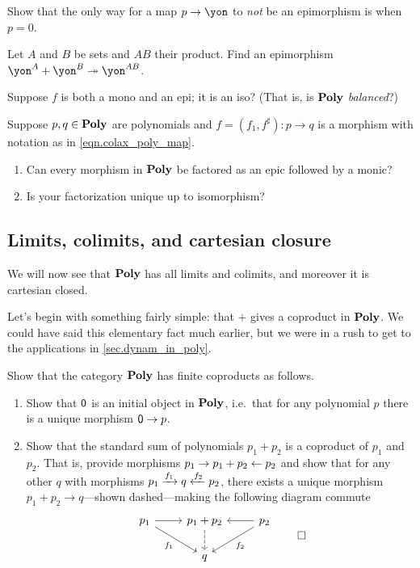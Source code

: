 \documentclass[Book-Poly]{subfiles}
\begin{document}
\begin{exercise}
Show that the only way for a map $p\to\yon$ to \emph{not} be an epimorphism is when $p=0$.
\end{exercise}

\begin{proposition}
Let $A$ and $B$ be sets and $AB$ their product. Find an epimorphism $\yon^A+\yon^B\surj\yon^{AB}$.
\end{proposition}

\begin{exercise}
Suppose $f$ is both a mono and an epi; it is an iso? (That is, is $\textbf{Poly}$ \emph{balanced}?)
\end{exercise}

\begin{exercise}\label{exc.mono_epi_poly}
Suppose $p,q\in\textbf{Poly}$ are polynomials and $f=(f_1,f^\sharp)\colon p\to q$ is a morphism with notation as in \cref{eqn.colax_poly_map}.
\begin{enumerate}
	\item Can every morphism in $\textbf{Poly}$ be factored as an epic followed by a monic?
	\item Is your factorization unique up to isomorphism?
\qedhere
\end{enumerate}
\end{exercise}



\subsection{Limits, colimits, and cartesian closure}

We will now see that $\textbf{Poly}$ has all limits and colimits, and moreover it is cartesian closed.

Let's begin with something fairly simple: that $+$ gives a coproduct in $\textbf{Poly}$. We could have said this elementary fact much earlier, but we were in a rush to get to the applications in \cref{sec.dynam_in_poly}.

\begin{exercise}
Show that the category $\textbf{Poly}$ has finite coproducts as follows.
\begin{enumerate}
	\item Show that $\textsf{0}$ is an initial object in $\textbf{Poly}$, i.e.\ that for any polynomial $p$ there is a unique morphism $\textsf{0}\to p$.
	\item Show that the standard sum of polynomials $p_1+p_2$ is a coproduct of $p_1$ and $p_2$. That is, provide morphisms $p_1\to p_1+p_2\leftarrow p_2$ and show that for any other $q$ with morphisms $p_1\xrightarrow{f_1} q\xleftarrow{f_2} p_2$, there exists a unique morphism $p_1+p_2\to q$---shown dashed---making the following diagram commute 
	\[
	\begin{tikzcd}
		p_1\ar[r]\ar[dr, "f_1"']&
		p_1+p_2\ar[d, dashed]&
		p_2\ar[l]\ar[dl, "f_2"]\\&
		q
	\end{tikzcd}
	\qedhere
	\]
\end{enumerate}
\end{exercise}
\end{document}
